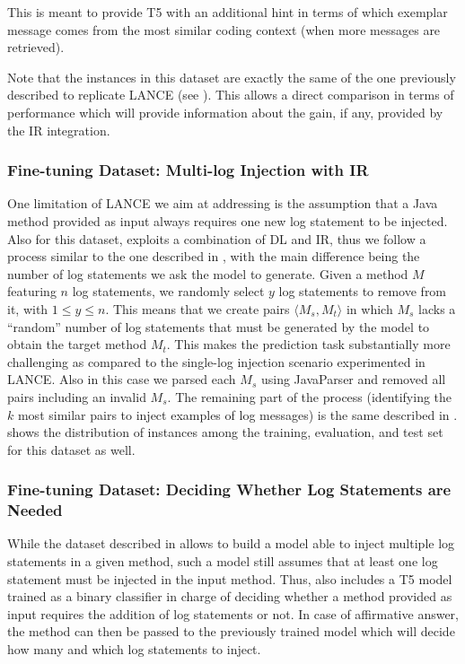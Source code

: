 This is meant to provide T5 with an additional hint in terms of which exemplar message comes from the most similar coding context (when more messages are retrieved).

Note that the instances in this dataset are exactly the same of the one previously described to replicate LANCE (see ). This allows a direct comparison in terms of performance which will provide information about the gain, if any, provided by the IR integration.


\subsubsection{Fine-tuning Dataset: Multi-log Injection with IR} \label{sec:multi-log-dataset}

One limitation of LANCE \cite{mastropaolo2022using} we aim at addressing is the assumption that a Java method provided as input always requires one new log statement to be injected. Also for this dataset, \approach exploits a combination of DL and IR, thus we follow a process similar to the one described in , with the main difference being the number of log statements we ask the model to generate. Given a method $M$ featuring $n$ log statements, we randomly select $y$ log statements to remove from it, with $1 \leq y \leq n$. This means that we create pairs $\langle M_s, M_t \rangle$ in which $M_s$ lacks a ``random'' number of log statements that must be generated by the model to obtain the target method $M_t$. This makes the prediction task substantially more challenging as compared to the single-log injection scenario experimented in LANCE. Also in this case we parsed each $M_s$ using JavaParser \cite{javaparser} and removed all pairs including an invalid $M_s$. The remaining part of the process (\ie identifying the $k$ most similar pairs to inject examples of log messages) is the same described in .  shows the distribution of instances among the training, evaluation, and test set for this dataset as well.


\subsubsection{Fine-tuning Dataset: Deciding Whether Log Statements are Needed} \label{sec:predicting-dataset}

While the dataset described in  allows to build a model able to inject multiple log statements in a given \java method, such a model still assumes that at least one log statement must be injected in the input method. Thus, \approach also includes a T5 model trained as a binary classifier in charge of deciding whether a method provided as input requires the addition of log statements or not. In case of affirmative answer, the method can then be passed to the previously trained model which will decide how many and which log statements to inject.

